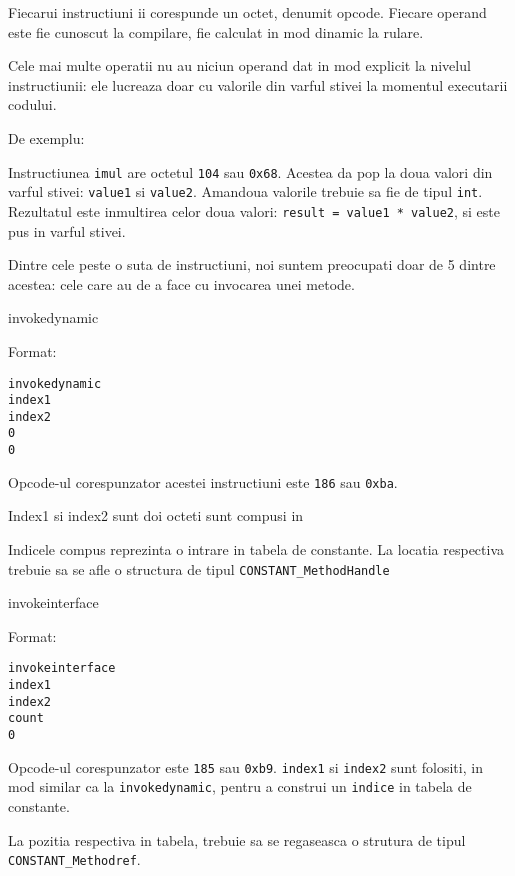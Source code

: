 Fiecarui instructiuni ii corespunde un octet, denumit opcode. Fiecare
operand este fie cunoscut la compilare, fie calculat in mod dinamic la
rulare.

Cele mai multe operatii nu au niciun operand dat in mod explicit la
nivelul instructiunii: ele lucreaza doar cu valorile din varful stivei
la momentul executarii codului.

De exemplu:

Instructiunea \texttt{imul} are octetul \texttt{104} sau \texttt{0x68}.
Acestea da pop la doua valori din varful stivei: \texttt{value1} si
\texttt{value2}. Amandoua valorile trebuie sa fie de tipul \texttt{int}.
Rezultatul este inmultirea celor doua valori:
\texttt{result\ =\ value1\ *\ value2}, si este pus in varful stivei.

Dintre cele peste o suta de instructiuni, noi suntem preocupati doar de
5 dintre acestea: cele care au de a face cu invocarea unei metode.

invokedynamic

Format:

\begin{verbatim}
invokedynamic
index1
index2
0
0
\end{verbatim}

Opcode-ul corespunzator acestei instructiuni este \texttt{186} sau
\texttt{0xba}.

Index1 si index2 sunt doi octeti sunt compusi in

\begin{Shaded}
\begin{Highlighting}[]
\end{Highlighting}
\end{Shaded}

Indicele compus reprezinta o intrare in tabela de constante. La locatia
respectiva trebuie sa se afle o structura de tipul
\texttt{CONSTANT\_MethodHandle}

invokeinterface

Format:

\begin{verbatim}
invokeinterface
index1
index2
count
0
\end{verbatim}

Opcode-ul corespunzator este \texttt{185} sau \texttt{0xb9}.
\texttt{index1} si \texttt{index2} sunt folositi, in mod similar ca la
\texttt{invokedynamic}, pentru a construi un \texttt{indice} in tabela
de constante.

La pozitia respectiva in tabela, trebuie sa se regaseasca o strutura de
tipul \texttt{CONSTANT\_Methodref}.

